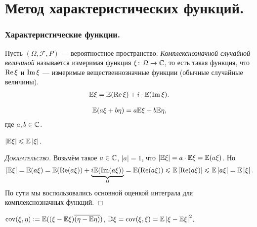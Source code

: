\documentclass[../main.tex]{subfiles}
\begin{document}
\newpage
\part{Метод характеристических функций.}
\section{Характеристические функции.}
\begin{df}
 Пусть $ (\Omega, \mathcal F, P) $ --- вероятностное пространство.
 \textit{Комплекснозначной случайной величиной} называется измеримая функция $ \xi \colon\, \Omega \to \mathbb{C} $, то есть такая функция, что $ \operatorname{Re} \xi $ и $ \operatorname{Im} \xi $ --- измеримые вещественнозначные функции (обычные случайные величины).
 \begin{align*}
  \mathbb E \xi = \mathbb E (\operatorname{Re} \xi) + i \cdot \mathbb E (\operatorname{Im} \xi).
 \end{align*}
\end{df}
\begin{prop}
 \begin{align*}
  \mathbb E(a\xi + b\eta) = a \mathbb E \xi + b \mathbb E \eta,
 \end{align*} где $ a,b \in \mathbb{C} $.
\end{prop}
\begin{prop}
 $ \left| \mathbb E \xi \right| \leqslant \mathbb E \left| \xi \right| $.
\end{prop}
\begin{proof}[\normalfont\textsc{Доказательство}]
 Возьмём такое $ a \in \mathbb{C} $, $ \left| a \right| = 1 $, что $ \left| \mathbb E \xi \right| = a \cdot \mathbb E \xi = \mathbb E(a\xi) $. Но
 \begin{align*}
  \left| \mathbb E\xi \right| = \mathbb E(a\xi) = \mathbb E(\operatorname{Re}(a\xi)) + \underbrace{i\mathbb E(\operatorname{Im}(a\xi))}_{0} = \mathbb E(\operatorname{Re}(a\xi)) \leqslant \mathbb E \left| \operatorname{Re}(a\xi) \right| \leqslant \mathbb E \left| a\xi \right| = \mathbb E \left| \xi \right|.
 \end{align*} По сути мы воспользовались основной оценкой интеграла для комплекснозначных функций.
\end{proof}

\begin{df}
 $ \mathrm{cov}(\xi,\eta) := \mathbb E((\xi-\mathbb E\xi) \overline{(\eta - \mathbb E\eta)}) $, $ \mathbb D\xi = \mathrm{cov}(\xi,\xi) = \mathbb E \left| \xi - \mathbb E\xi \right|^{2} $.
\end{df}
\end{document}
